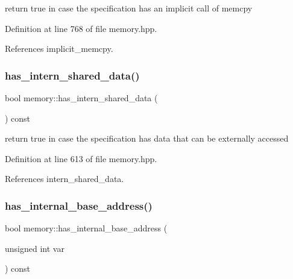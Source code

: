 return true in case the specification has an implicit call of memcpy 



Definition at line 768 of file memory.\+hpp.



References implicit\+\_\+memcpy.

\mbox{\label{classmemory_a815f393ee72721eb6ccdf002441b1b0f}} 
\subsubsection{\texorpdfstring{has\+\_\+intern\+\_\+shared\+\_\+data()}{has\_intern\_shared\_data()}}
{\footnotesize\ttfamily bool memory\+::has\+\_\+intern\+\_\+shared\+\_\+data (\begin{DoxyParamCaption}{ }\end{DoxyParamCaption}) const\hspace{0.3cm}{\ttfamily [inline]}}



return true in case the specification has data that can be externally accessed 



Definition at line 613 of file memory.\+hpp.



References intern\+\_\+shared\+\_\+data.

\mbox{\label{classmemory_a7008ca7ac0edcff1f6bece9751e46eac}} 
\subsubsection{\texorpdfstring{has\+\_\+internal\+\_\+base\+\_\+address()}{has\_internal\_base\_address()}}
{\footnotesize\ttfamily bool memory\+::has\+\_\+internal\+\_\+base\+\_\+address (\begin{DoxyParamCaption}\item[{unsigned int}]{var }\end{DoxyParamCaption}) const}



